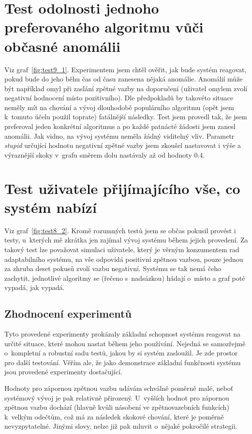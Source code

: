 \documentclass[thesis=M,czech]{FITthesis}[2014/05/07]
\begin{document}
\section{Test odolnosti jednoho preferovaného algoritmu vůči občasné anomálii}
Viz graf~\ref{fig:test9_1}. Experimentem jsem chtěl ověřit, jak bude systém reagovat, pokud bude do jeho běhu čas od času zanesena nějaká anomálie. Anomálií může být například omyl při zaslání zpětné vazby na doporučení (uživatel omylem zvolí negativní hodnocení místo pozitivního). Dle předpokladů by takovéto situace neměly mít na chování a vývoj dlouhodobě populárního algoritmu (opět jsem k~tomuto účelu použil toprate) fatálnější následky. Test jsem provedl tak, že jsem preferoval jeden konkrétní algoritmus a po každé patnácté žádosti jsem zanesl anomálii. Jak vidno, na vývoj systému neměla žádný viditelný vliv. Parametr \emph{stupid} určující hodnotu negativní zpětné vazby jsem zkoušel nastavovat i výše a výraznější skoky v~grafu směrem dolu nastávaly až od hodnoty $0.4$.

\section{Test uživatele přijímajícího vše, co systém nabízí}
Viz graf~\ref{fig:test8_2}. Kromě rozumných testů jsem se občas pokusil provést i testy, u~kterých mě zkrátka jen zajímal vývoj systému během jejich provedení. Za takový test lze považovat simulaci uživatele, který je věrným konzumentem rad adaptabilního systému, na vše odpovídá positivní zpětnou vazbou, pouze jednou za zhruba deset pokusů zvolí vazbu negativní. Systému se tak nemá čeho zachytit, jednotlivé algoritmy se (řečeno s~nadsázkou) hádají o~místo a graf poté vypadá, jak vypadá.

\subsection{Zhodnocení experimentů}
Tyto provedené experimenty prokázaly základní schopnost systému reagovat na určité situace, které mohou nastat během jeho používání. Nejedná se samozřejmě o~kompletní a robustní sadu testů, jakou by si systém zasloužil. Je zde prostor pro další testování. Věřím ale, že jako demonstrace základní funkčnosti systému jsou provedené experimenty dostačující. 

Hodnoty pro zápornou zpětnou vazbu udávám schválně poměrně malé, neboť systémový vývoj je pak relativně přirozený. U~vyšších hodnot pro zápornou zpětnou vazbu dochází (hlavně kvůli násobení ve zpětnovazebních funkcích) k~velkým odečtům, což má za následek skokové chování, které je poměrně nevyzpytatelné. Jinými slovy, nelze již pak mluvit o~nějaké pokročilé strategii.
\end{document}
